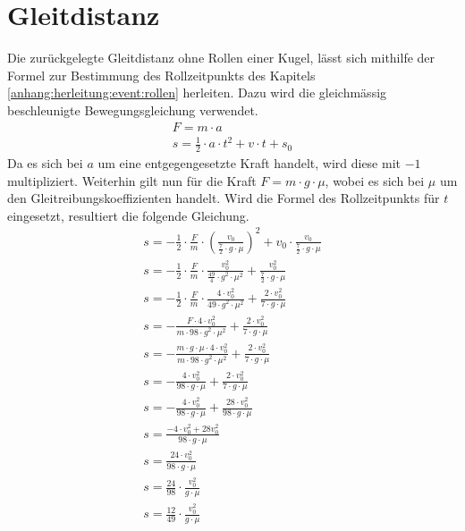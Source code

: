 \section{Gleitdistanz}\label{anhang:herleitung:gleitdistanz}
Die zurückgelegte Gleitdistanz ohne Rollen einer Kugel, lässt sich mithilfe der Formel zur Bestimmung des Rollzeitpunkts
des Kapitels \ref{anhang:herleitung:event:rollen} herleiten.
Dazu wird die gleichmässig beschleunigte Bewegungsgleichung verwendet.
\begin{align}
    F = m \cdot a\\
    s = \frac{1}{2} \cdot a \cdot t^2 + v \cdot t + s_0
\end{align}
Da es sich bei $a$ um eine entgegengesetzte Kraft handelt, wird diese mit $-1$ multipliziert. Weiterhin gilt nun für die
Kraft $F = m \cdot g \cdot \mu$, wobei es sich bei $\mu$ um den Gleitreibungskoeffizienten handelt. Wird die Formel des Rollzeitpunkts
für $t$ eingesetzt, resultiert die folgende Gleichung.
\begin{align}
    s = -\frac{1}{2} \cdot \frac{F}{m} \cdot (\frac{v_0}{\frac{7}{2} \cdot g \cdot \mu})^2 + v_0 \cdot \frac{v_0}{\frac{7}{2} \cdot g \cdot \mu}\\
    s = -\frac{1}{2} \cdot \frac{F}{m} \cdot \frac{v_0^2}{\frac{49}{4} \cdot g^2 \cdot \mu^2} + \frac{v_0^2}{\frac{7}{2} \cdot g \cdot \mu}\\
    s = -\frac{1}{2} \cdot \frac{F}{m} \cdot \frac{4 \cdot v_0^2}{49 \cdot g^2 \cdot \mu^2} + \frac{2 \cdot v_0^2}{7 \cdot g \cdot \mu}\\
    s = -\frac{F \cdot 4 \cdot v_0^2}{m \cdot 98 \cdot g^2 \cdot \mu^2} + \frac{2 \cdot v_0^2}{7 \cdot g \cdot \mu}\\
    s = -\frac{m \cdot g \cdot \mu \cdot 4 \cdot v_0^2}{m \cdot 98 \cdot g^2 \cdot \mu^2} + \frac{2 \cdot v_0^2}{7 \cdot g \cdot \mu}\\
    s = -\frac{4 \cdot v_0^2}{98 \cdot g \cdot \mu} + \frac{2 \cdot v_0^2}{7 \cdot g \cdot \mu}\\
    s = -\frac{4 \cdot v_0^2}{98 \cdot g \cdot \mu} + \frac{28 \cdot v_0^2}{98 \cdot g \cdot \mu}\\
    s = \frac{-4 \cdot v_0^2 + 28 v_0^2}{98 \cdot g \cdot \mu}\\
    s = \frac{24 \cdot v_0^2}{98 \cdot g \cdot \mu}\\
    s = \frac{24}{98} \cdot \frac{v_0^2}{g \cdot \mu}\\
    s = \frac{12}{49} \cdot \frac{v_0^2}{g \cdot \mu}
\end{align}
